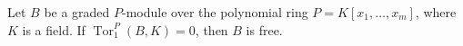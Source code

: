 Let $B$ be a graded $P$-module over the polynomial ring $P = K[x_1, \ldots, x_m]$, where $K$ is a field. If $\operatorname{Tor}_1^P(B, K) = 0$, then $B$ is free.
